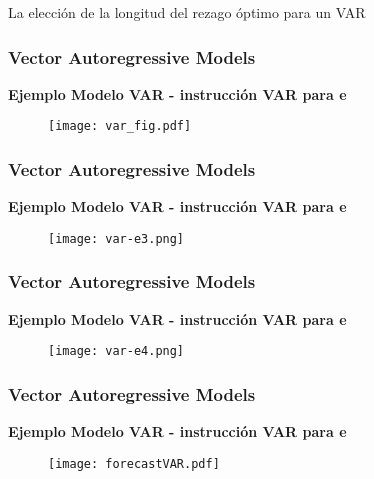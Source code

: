 \documentclass[spanish,xcolor=table]{beamer}
\begin{document}
\begin{section}{La elecci\'on de la longitud del rezago \'optimo para un VAR}
\begin{frame}
\end{frame}
\begin{frame}
\frametitle{Vector Autoregressive Models}
\textbf{Ejemplo Modelo VAR - instrucci\'on VAR para e}

\begin{figure}[t!]
\texttt{[image: var\_fig.pdf]}
\end{figure}

\end{frame}
\begin{frame}
\frametitle{Vector Autoregressive Models}
\textbf{Ejemplo Modelo VAR - instrucci\'on VAR para e}

\begin{figure}[t!]
\texttt{[image: var-e3.png]}
\end{figure}

\end{frame}
\begin{frame}
\frametitle{Vector Autoregressive Models}
\textbf{Ejemplo Modelo VAR - instrucci\'on VAR para e}

\begin{figure}[t!]
\texttt{[image: var-e4.png]}
\end{figure}

\end{frame}
\end{section}
\begin{frame}
\frametitle{Vector Autoregressive Models}
\textbf{Ejemplo Modelo VAR - instrucci\'on VAR para e}

\begin{figure}[t!]
\texttt{[image: forecastVAR.pdf]}
\end{figure}

\end{frame}
\end{document}
